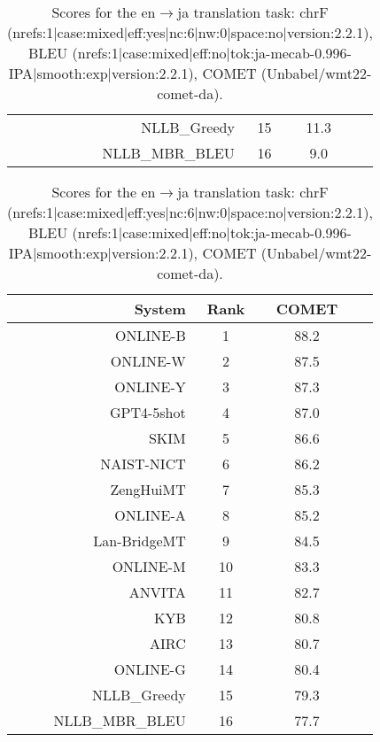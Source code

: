 \documentclass[11pt]{article}
\begin{document}
\begin{table}
\begin{subtable}[t]{0.33\textwidth}
\begin{tabular}{rccc}
NLLB\_Greedy & 15 & 11.3 \\ 
NLLB\_MBR\_BLEU & 16 & 9.0 \\ 
\bottomrule 
\end{tabular} 
\end{subtable} 
\begin{subtable}[t]{0.33\textwidth}
\begin{tabular}{rccc}
\toprule 
System & Rank & COMET \\ 
\midrule 
ONLINE-B & 1 & 88.2 \\ 
ONLINE-W & 2 & 87.5 \\ 
ONLINE-Y & 3 & 87.3 \\ 
GPT4-5shot & 4 & 87.0 \\ 
SKIM & 5 & 86.6 \\ 
NAIST-NICT & 6 & 86.2 \\ 
ZengHuiMT & 7 & 85.3 \\ 
ONLINE-A & 8 & 85.2 \\ 
Lan-BridgeMT & 9 & 84.5 \\ 
ONLINE-M & 10 & 83.3 \\ 
ANVITA & 11 & 82.7 \\ 
KYB & 12 & 80.8 \\ 
AIRC & 13 & 80.7 \\ 
ONLINE-G & 14 & 80.4 \\ 
NLLB\_Greedy & 15 & 79.3 \\ 
NLLB\_MBR\_BLEU & 16 & 77.7 \\ 
\bottomrule 
\end{tabular} 
\end{subtable} 
\caption{Scores for the en$\rightarrow$ja translation task: chrF (nrefs:1|case:mixed|eff:yes|nc:6|nw:0|space:no|version:2.2.1), BLEU (nrefs:1|case:mixed|eff:no|tok:ja-mecab-0.996-IPA|smooth:exp|version:2.2.1), COMET (Unbabel/wmt22-comet-da).} 
\end{table} 
\end{document}

